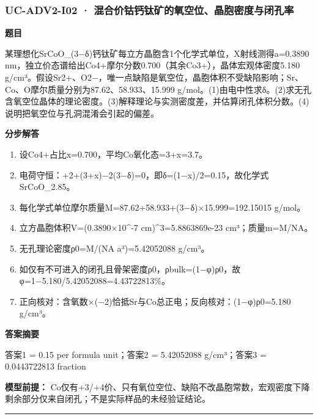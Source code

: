 \documentclass[UTF8,11pt,a4paper]{ctexart}
\begin{document}
\subsubsection*{UC-ADV2-I02 · 混合价钴钙钛矿的氧空位、晶胞密度与闭孔率}
\noindent\textbf{题目}\par
某理想化SrCoO\_(3−δ)钙钛矿每立方晶胞含1个化学式单位，X射线测得a=0.3890 nm，独立价态谱给出Co4+摩尔分数0.700（其余Co3+），晶体宏观体密度5.180 g/cm³。假设Sr2+、O2−，唯一点缺陷是氧空位，晶胞体积不受缺陷影响；Sr、Co、O摩尔质量分别为87.62、58.933、15.999 g/mol。(1)由电中性求δ。(2)求无孔含氧空位晶体的理论密度。(3)解释理论与实测密度差，并估算闭孔体积分数。(4)说明把氧空位与孔洞混淆会引起的偏差。\par
\medskip\noindent\textbf{分步解答}
\begin{enumerate}
\item 设Co4+占比x=0.700，平均Co氧化态=3+x=3.7。
\item 电荷守恒：+2+(3+x)−2(3−δ)=0，即δ=(1−x)/2=0.15，故化学式SrCoO\_2.85。
\item 每化学式单位摩尔质量M=87.62+58.933+(3−δ)×15.999=192.15015 g/mol。
\item 立方晶胞体积V=(0.3890×10\textasciicircum{}-7 cm)\textasciicircum{}3=5.8863869e-23 cm³；质量m=M/NA。
\item 无孔理论密度ρ0=M/(NA a³)=5.42052088 g/cm³。
\item 如仅有不可进入的闭孔且骨架密度ρ0，ρbulk=(1−φ)ρ0，故φ=1−5.180/5.42052088=4.43722813\%。
\item 正向核对：含氧数×(−2)恰抵Sr与Co总正电；反向核对：(1−φ)ρ0=5.180 g/cm³。
\end{enumerate}
\noindent\textbf{答案摘要}\par
答案1 = 0.15 per formula unit；答案2 = 5.42052088 g/cm³；答案3 = 0.0443722813 fraction\par
\noindent\textbf{模型前提：}
Co仅有+3/+4价、只有氧位空位、缺陷不改晶胞常数，宏观密度下降剩余部分仅来自闭孔；不是实际样品的未经验证结论。\par
\medskip\hrule\medskip
{}
\end{document}
